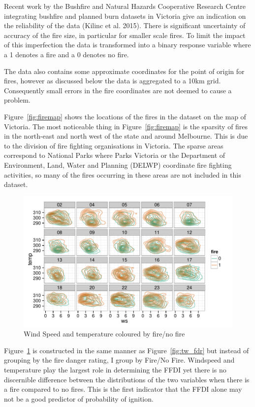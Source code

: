 \documentclass[11pt,a4paper]{article}
\begin{document}
Recent work by the Bushfire and Natural Hazards Cooperative Research Centre integrating bushfire and planned burn datasets in Victoria give an indication on the reliability of the data (Kilinc et al. 2015).  There is significant uncertainty of accuracy of the fire size, in particular for smaller scale fires. To limit the impact of this imperfection the data is transformed into a binary response variable where a 1 denotes a fire and a 0 denotes no fire.

The data also contains some approximate coordinates for the point of origin for fires, however as discussed below the data is aggregated to a 10km grid. Consequently small errors in the fire coordinates are not deemed to cause a problem.

Figure~\ref{fig:firemap} shows the locations of the fires in the dataset on the map of Victoria. The most noticeable thing in Figure~\ref{fig:firemap} is the sparsity of fires in the north-east and north west of the state and around Melbourne. This is due to the division of fire fighting organisations in Victoria. The sparse areas correspond to National Parks where Parks Victoria or the Department of Environment, Land, Water and Planning (DELWP) coordinate fire fighting activities, so many of the fires occurring in these areas are not included in this dataset.




\begin{figure}
  \centering
	\includegraphics[width=1\columnwidth]{figures/tw_fire.pdf}
  \caption{Wind Speed and temperature coloured by fire/no fire}
  \label{fig:tw_fire}
\end{figure}

Figure~\ref{fig:tw_fire} is constructed in the same manner as Figure~\ref{fig:tw_fdr} but instead of grouping by the fire danger rating, I group by Fire/No Fire. Windspeed and temperature play the largest role in determining the FFDI yet there is no discernible difference between the distributions of the two variables when there is a fire compared to no fires. This is the first indicator that the FFDI alone may not be a good predictor of probability of ignition.
\end{document}
